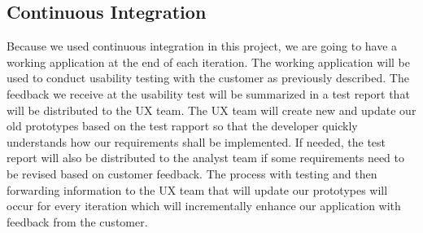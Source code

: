 \subsection{Continuous Integration}
Because we used continuous integration in this project, we are going to have a working application at the end of each iteration. The working application will be used to conduct usability testing with the customer as previously described. The feedback we receive at the usability test will be summarized in a test report that will be distributed to the UX team. The UX team will create new and update our old prototypes based on the test rapport so that the developer quickly understands how our requirements shall be implemented. If needed, the test report will also be distributed to the analyst team if some requirements need to be revised based on customer feedback. The process with testing and then forwarding information to the UX team that will update our prototypes will occur for every iteration which will incrementally enhance our application with feedback from the customer.